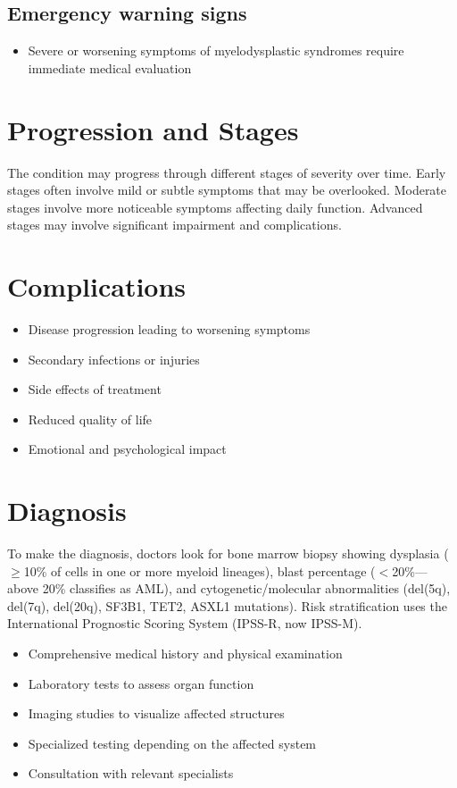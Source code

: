 \subsection{Emergency warning signs}
\begin{itemize}[noitemsep]
  \item Severe or worsening symptoms of myelodysplastic syndromes require immediate medical evaluation
\end{itemize}
\section{Progression and Stages}
The condition may progress through different stages of severity over time. Early stages often involve mild or subtle symptoms that may be overlooked. Moderate stages involve more noticeable symptoms affecting daily function. Advanced stages may involve significant impairment and complications.
\section{Complications}
\begin{itemize}[noitemsep]
  \item Disease progression leading to worsening symptoms
  \item Secondary infections or injuries
  \item Side effects of treatment
  \item Reduced quality of life
  \item Emotional and psychological impact
\end{itemize}
\section{Diagnosis}
To make the diagnosis, doctors look for bone marrow biopsy showing dysplasia ($\geq$10\% of cells in one or more myeloid lineages), blast percentage ($<$20\%---above 20\% classifies as AML), and cytogenetic/molecular abnormalities (del(5q), del(7q), del(20q), SF3B1, TET2, ASXL1 mutations). Risk stratification uses the International Prognostic Scoring System (IPSS-R, now IPSS-M).

\begin{itemize}[noitemsep]
  \item Comprehensive medical history and physical examination
  \item Laboratory tests to assess organ function
  \item Imaging studies to visualize affected structures
  \item Specialized testing depending on the affected system
  \item Consultation with relevant specialists
\end{itemize}
